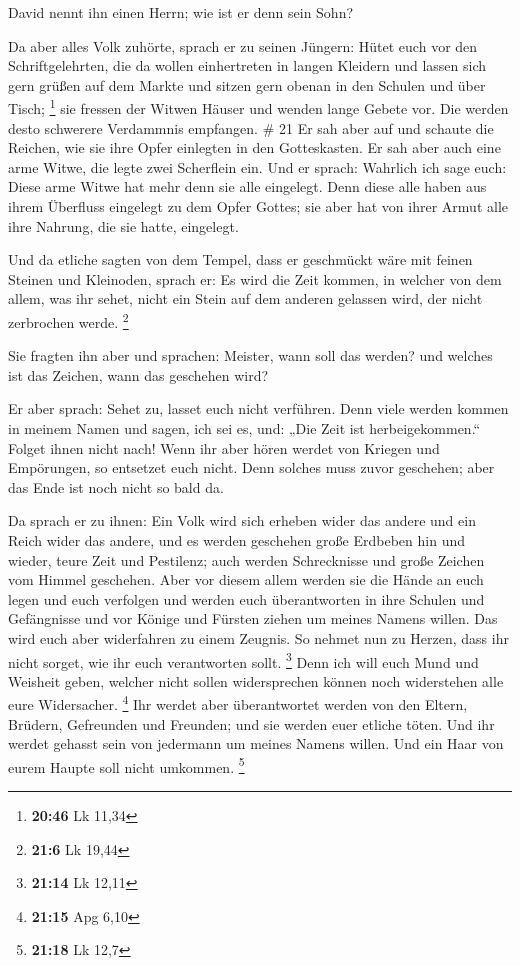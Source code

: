  David nennt ihn einen Herrn; wie ist er denn sein Sohn?

 Da aber alles Volk zuhörte, sprach er zu seinen Jüngern:
 Hütet euch vor den Schriftgelehrten, die da wollen
einhertreten in langen Kleidern und lassen sich gern grüßen auf dem
Markte und sitzen gern obenan in den Schulen und über Tisch; \footnote{\textbf{20:46}
  Lk 11,34}  sie fressen der Witwen Häuser und wenden lange
Gebete vor. Die werden desto schwerere Verdammnis empfangen. \# 21
 Er sah aber auf und schaute die Reichen, wie sie ihre Opfer
einlegten in den Gotteskasten.  Er sah aber auch eine arme
Witwe, die legte zwei Scherflein ein.  Und er sprach:
Wahrlich ich sage euch: Diese arme Witwe hat mehr denn sie alle
eingelegt.  Denn diese alle haben aus ihrem Überfluss
eingelegt zu dem Opfer Gottes; sie aber hat von ihrer Armut alle ihre
Nahrung, die sie hatte, eingelegt.

 Und da etliche sagten von dem Tempel, dass er geschmückt
wäre mit feinen Steinen und Kleinoden, sprach er:  Es wird
die Zeit kommen, in welcher von dem allem, was ihr sehet, nicht ein
Stein auf dem anderen gelassen wird, der nicht zerbrochen werde.
\footnote{\textbf{21:6} Lk 19,44}

 Sie fragten ihn aber und sprachen: Meister, wann soll das
werden? und welches ist das Zeichen, wann das geschehen wird?

 Er aber sprach: Sehet zu, lasset euch nicht verführen. Denn
viele werden kommen in meinem Namen und sagen, ich sei es, und: „Die
Zeit ist herbeigekommen.`` Folget ihnen nicht nach!  Wenn
ihr aber hören werdet von Kriegen und Empörungen, so entsetzet euch
nicht. Denn solches muss zuvor geschehen; aber das Ende ist noch nicht
so bald da.

 Da sprach er zu ihnen: Ein Volk wird sich erheben wider
das andere und ein Reich wider das andere,  und es werden
geschehen große Erdbeben hin und wieder, teure Zeit und Pestilenz; auch
werden Schrecknisse und große Zeichen vom Himmel geschehen.
 Aber vor diesem allem werden sie die Hände an euch legen
und euch verfolgen und werden euch überantworten in ihre Schulen und
Gefängnisse und vor Könige und Fürsten ziehen um meines Namens willen.
 Das wird euch aber widerfahren zu einem Zeugnis.
 So nehmet nun zu Herzen, dass ihr nicht sorget, wie ihr
euch verantworten sollt. \footnote{\textbf{21:14} Lk 12,11}
 Denn ich will euch Mund und Weisheit geben, welcher nicht
sollen widersprechen können noch widerstehen alle eure Widersacher.
\footnote{\textbf{21:15} Apg 6,10}  Ihr werdet aber
überantwortet werden von den Eltern, Brüdern, Gefreunden und Freunden;
und sie werden euer etliche töten.  Und ihr werdet gehasst
sein von jedermann um meines Namens willen.  Und ein Haar
von eurem Haupte soll nicht umkommen. \footnote{\textbf{21:18} Lk 12,7}

